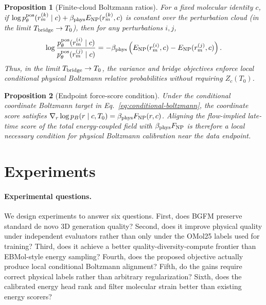 \documentclass{article}
\newtheorem{proposition}{Proposition}
\begin{document}
\begin{proposition}[Finite-cloud Boltzmann ratios]
For a fixed molecular identity $c$, if
$\log p_\theta^{\rm pos}(r_m^{(k)}\mid c)+\beta_{\rm phys} E_{\rm NP}(r_m^{(k)},c)$ is
constant over the perturbation cloud (in the limit $T_{\rm bridge} \to T_0$),
then for any perturbations $i,j$,
\begin{equation}
    \log\frac{p_\theta^{\rm pos}(r_m^{(i)}\mid c)}
    {p_\theta^{\rm pos}(r_m^{(j)}\mid c)}
    =-\beta_{\rm phys}\left(E_{\rm NP}(r_m^{(i)},c)-E_{\rm NP}(r_m^{(j)},c)\right).
\end{equation}
Thus, in the limit $T_{\rm bridge} \to T_0$, the variance and bridge
objectives enforce local conditional physical Boltzmann relative
probabilities without requiring $Z_c(T_0)$.
\end{proposition}

\begin{proposition}[Endpoint force-score condition]
Under the conditional coordinate Boltzmann target in
Eq.~\eqref{eq:conditional-boltzmann}, the coordinate score satisfies
$\nabla_r\log p_B(r\mid c,T_0)=\beta_{\rm phys} F_{\rm NP}(r,c)$.
Aligning the flow-implied late-time score of the total energy-coupled
field with $\beta_{\rm phys} F_{\rm NP}$ is therefore a local necessary
condition for physical Boltzmann calibration near the data endpoint.
\end{proposition}

\section{Experiments}

\paragraph{Experimental questions.}
We design experiments to answer six questions. First, does BGFM preserve
standard de novo 3D generation quality? Second, does it improve physical
quality under independent evaluators rather than only under the OMol25
labels used for training? Third, does it achieve a better
quality-diversity-compute frontier than EBMol-style energy sampling?
Fourth, does the proposed objective actually produce local conditional
Boltzmann alignment? Fifth, do the gains require correct physical
labels rather than arbitrary regularization? Sixth, does the calibrated
energy head rank and filter molecular strain better than existing energy
scorers?
\end{document}
